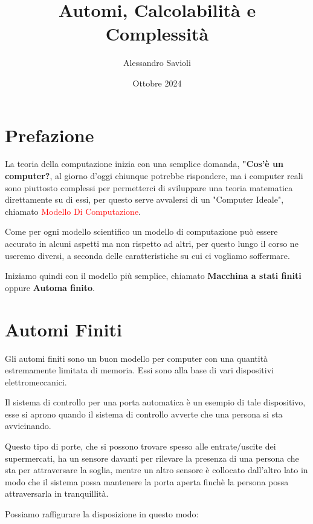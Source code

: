\documentclass{article}
\begin{document}
\title{Automi, Calcolabilità e Complessità}
\author{Alessandro Savioli}
\date{Ottobre 2024}

\maketitle

\tableofcontents

\newpage

\section{Prefazione}

La teoria della computazione inizia con una semplice domanda, \textbf{"Cos'è un computer?}, al giorno d'oggi chiunque potrebbe rispondere, ma i computer reali sono piuttosto complessi per permetterci di sviluppare una teoria matematica direttamente su di essi, per questo serve avvalersi di un "Computer Ideale", chiamato \textcolor{red}{Modello Di Computazione}.

Come per ogni modello scientifico un modello di computazione può essere accurato in alcuni aspetti ma non rispetto ad altri, per questo lungo il corso ne useremo diversi, a seconda delle caratteristiche su cui ci vogliamo soffermare.

Iniziamo quindi con il modello più semplice, chiamato \textbf{Macchina a stati finiti} oppure \textbf{Automa finito}.

\section{Automi Finiti}
Gli automi finiti sono un buon modello per computer con una quantità estremamente limitata di memoria. Essi sono alla base di vari dispositivi elettromeccanici. 

Il sistema di controllo per una porta automatica è un esempio di tale dispositivo, esse si aprono quando il sistema di controllo avverte che una persona si sta avvicinando. 

Questo tipo di porte, che si possono trovare spesso alle entrate/uscite dei supermercati, ha un sensore davanti per rilevare la presenza di una persona che sta per attraversare la soglia, mentre un altro sensore è collocato dall'altro lato in modo che il sistema possa mantenere la porta aperta finchè la persona possa attraversarla in tranquillità. 

Possiamo raffigurare la disposizione in questo modo: 
\end{document}

